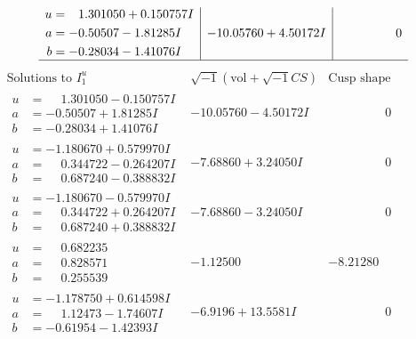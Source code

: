 \documentclass[1p]{elsarticle_modified}
\theoremstyle{definition}
\newcommand{\I}{\sqrt{-1}}
\begin{document}
$$\begin{array}{c|c|c}
\begin{aligned}
u &= \phantom{-}1.301050 + 0.150757 I \\
a &= -0.50507 - 1.81285 I \\
b &= -0.28034 - 1.41076 I\end{aligned}
 & -10.05760 + 4.50172 I & \phantom{-0.000000 } 0\\
 \hline 
 \end{array}$$\newpage$$\begin{array}{c|c|c}  
\text{Solutions to }I^u_{1}& \I (\text{vol} + \sqrt{-1}CS) & \text{Cusp shape}\\
 \hline 
\begin{aligned}
u &= \phantom{-}1.301050 - 0.150757 I \\
a &= -0.50507 + 1.81285 I \\
b &= -0.28034 + 1.41076 I\end{aligned}
 & -10.05760 - 4.50172 I & \phantom{-0.000000 } 0 \\ \hline\begin{aligned}
u &= -1.180670 + 0.579970 I \\
a &= \phantom{-}0.344722 - 0.264207 I \\
b &= \phantom{-}0.687240 - 0.388832 I\end{aligned}
 & -7.68860 + 3.24050 I & \phantom{-0.000000 } 0 \\ \hline\begin{aligned}
u &= -1.180670 - 0.579970 I \\
a &= \phantom{-}0.344722 + 0.264207 I \\
b &= \phantom{-}0.687240 + 0.388832 I\end{aligned}
 & -7.68860 - 3.24050 I & \phantom{-0.000000 } 0 \\ \hline\begin{aligned}
u &= \phantom{-}0.682235\phantom{ +0.000000I} \\
a &= \phantom{-}0.828571\phantom{ +0.000000I} \\
b &= \phantom{-}0.255539\phantom{ +0.000000I}\end{aligned}
 & -1.12500\phantom{ +0.000000I} & -8.21280\phantom{ +0.000000I} \\ \hline\begin{aligned}
u &= -1.178750 + 0.614598 I \\
a &= \phantom{-}1.12473 - 1.74607 I \\
b &= -0.61954 - 1.42393 I\end{aligned}
 & -6.9196 + 13.5581 I & \phantom{-0.000000 } 0 \\ \hline\begin{aligned}

\end{aligned}
\end{array}$$
\end{document}
